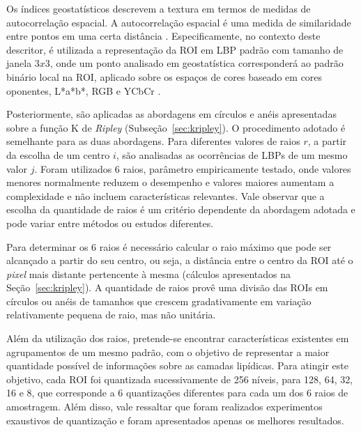 Os índices geostatísticos descrevem a textura em termos de medidas de autocorrelação espacial. A autocorrelação espacial é uma medida de similaridade entre pontos em uma certa distância \cite{clark1979practical}. Especificamente, no contexto deste descritor, é utilizada a representação da ROI em LBP padrão com tamanho de janela $3x3$, onde um ponto analisado em geostatística corresponderá ao padrão binário local na ROI, aplicado sobre os espaços de cores baseado em cores oponentes, L*a*b*, RGB e YCbCr \cite{plataniotis2013color}.

Posteriormente, são aplicadas as abordagens em círculos e anéis apresentadas sobre a função K de \textit{Ripley} (Subseção~\ref{sec:kripley}). O procedimento adotado é semelhante para as duas abordagens. Para diferentes valores de raios $r$, a partir da escolha de um centro $i$, são analisadas as ocorrências de LBPs de um mesmo valor $j$. Foram utilizados 6 raios, parâmetro empiricamente testado, onde valores menores normalmente reduzem o desempenho e valores maiores aumentam a complexidade e não incluem características relevantes. Vale observar que a escolha da quantidade de raios é um critério dependente da abordagem adotada e pode variar entre métodos ou estudos diferentes.

Para determinar os 6 raios é necessário calcular o raio máximo que pode ser alcançado a partir do seu centro, ou seja, a distância entre o centro da ROI até o \textit{pixel} mais distante pertencente à mesma (cálculos apresentados na Seção~\ref{sec:kripley}). A quantidade de raios provê uma divisão das ROIs em círculos ou anéis de tamanhos que crescem gradativamente em variação relativamente pequena de raio, mas não unitária. %

Além da utilização dos raios, pretende-se encontrar características existentes em agrupamentos de um mesmo padrão, com o objetivo de representar a maior quantidade possível de informações sobre as camadas lipídicas. Para atingir este objetivo, cada ROI foi quantizada sucessivamente de 256 níveis, para 128, 64, 32, 16 e 8, que corresponde a 6 quantizações diferentes para cada um dos 6 raios de amostragem. Além disso, vale ressaltar que foram realizados experimentos exaustivos de quantização e foram apresentados apenas os melhores resultados.

